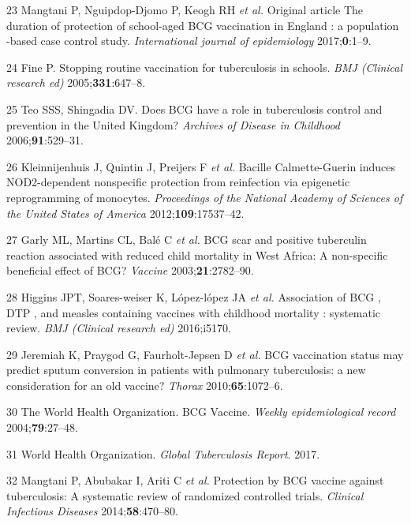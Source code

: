\documentclass[11pt,twoside]{bristolthesis}
\begin{document}
  \leavevmode\hypertarget{ref-Mangtani2017}{}%
  23 Mangtani P, Nguipdop-Djomo P, Keogh RH \emph{et al.} Original article The duration of protection of school-aged BCG vaccination in England : a population -based case control study. \emph{International journal of epidemiology} 2017;\textbf{0}:1--9.
  
  \leavevmode\hypertarget{ref-Fine2005a}{}%
  24 Fine P. Stopping routine vaccination for tuberculosis in schools. \emph{BMJ (Clinical research ed)} 2005;\textbf{331}:647--8.
  
  \leavevmode\hypertarget{ref-Teo2006}{}%
  25 Teo SSS, Shingadia DV. Does BCG have a role in tuberculosis control and prevention in the United Kingdom? \emph{Archives of Disease in Childhood} 2006;\textbf{91}:529--31.
  
  \leavevmode\hypertarget{ref-Kleinnijenhuis2012}{}%
  26 Kleinnijenhuis J, Quintin J, Preijers F \emph{et al.} Bacille Calmette-Guerin induces NOD2-dependent nonspecific protection from reinfection via epigenetic reprogramming of monocytes. \emph{Proceedings of the National Academy of Sciences of the United States of America} 2012;\textbf{109}:17537--42.
  
  \leavevmode\hypertarget{ref-Garly2003}{}%
  27 Garly ML, Martins CL, Balé C \emph{et al.} BCG scar and positive tuberculin reaction associated with reduced child mortality in West Africa: A non-specific beneficial effect of BCG? \emph{Vaccine} 2003;\textbf{21}:2782--90.
  
  \leavevmode\hypertarget{ref-Higgins}{}%
  28 Higgins JPT, Soares-weiser K, López-lópez JA \emph{et al.} Association of BCG , DTP , and measles containing vaccines with childhood mortality : systematic review. \emph{BMJ (Clinical research ed)} 2016;i5170.
  
  \leavevmode\hypertarget{ref-Jeremiah2010}{}%
  29 Jeremiah K, Praygod G, Faurholt-Jepsen D \emph{et al.} BCG vaccination status may predict sputum conversion in patients with pulmonary tuberculosis: a new consideration for an old vaccine? \emph{Thorax} 2010;\textbf{65}:1072--6.
  
  \leavevmode\hypertarget{ref-The2004}{}%
  30 The World Health Organization. BCG Vaccine. \emph{Weekly epidemiological record} 2004;\textbf{79}:27--48.
  
  \leavevmode\hypertarget{ref-WHO2017}{}%
  31 World Health Organization. \emph{Global Tuberculosis Report}. 2017.
  
  \leavevmode\hypertarget{ref-Mangtani2014}{}%
  32 Mangtani P, Abubakar I, Ariti C \emph{et al.} Protection by BCG vaccine against tuberculosis: A systematic review of randomized controlled trials. \emph{Clinical Infectious Diseases} 2014;\textbf{58}:470--80.
  
\end{document}
